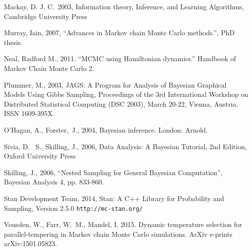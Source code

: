 \begin{thebibliography}{999}
 Mackay,
D. J. C.\ 2003, Information theory, Inference, and Learning
Algorithms, Cambridge University Press

Murray, Iain, 2007, ``Advances in Markov chain Monte Carlo methods.'',
PhD thesis.

Neal, Radford M., 2011. ``MCMC using Hamiltonian dynamics.''
Handbook of Markov Chain Monte Carlo 2.

Plummer, M., 2003, JAGS: A Program for Analysis of Bayesian Graphical Models
Using Gibbs Sampling, Proceedings of the 3rd International Workshop on
Distributed Statistical Computing (DSC 2003), March 20-22, Vienna, Austria.
ISSN 1609-395X.

O'Hagan, A., Forster,~J., 2004, Bayesian inference. London: Arnold.

 Sivia, 
D.~ S., Skilling, J., 2006, Data Analysis: A Bayesian Tutorial, 2nd 
Edition, Oxford University Press

 Skilling, 
J., 2006, ``Nested Sampling for General Bayesian Computation'', Bayesian 
Analysis 4, pp. 833-860.

 Stan Development Team, 2014,
Stan: A C++ Library for Probability and Sampling, Version 2.5.0
{\tt http://mc-stan.org/}

 Vousden, W., Farr, 
W.~M., Mandel, I. 2015. Dynamic temperature selection for 
parallel-tempering in Markov chain Monte Carlo simulations. ArXiv e-prints 
arXiv:1501.05823. 

\end{thebibliography}



%

